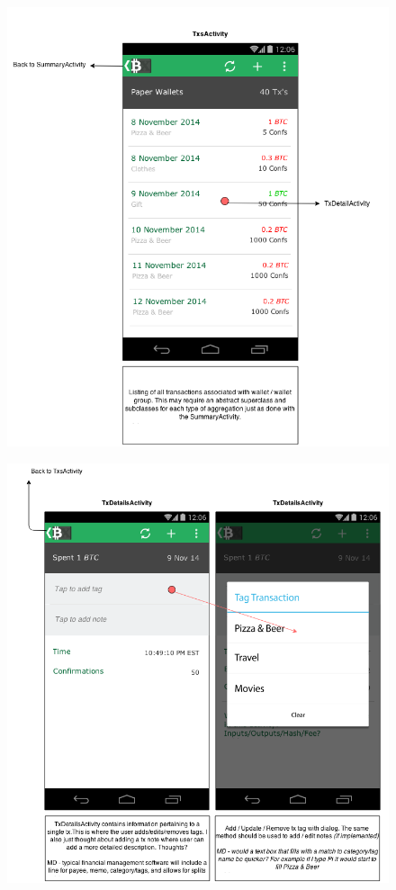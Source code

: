   \begin{figure}[H]
    \includegraphics[width=1.0\textwidth]{../diagrams/storyboard_txs.png}
  \end{figure}
  \begin{figure}[H]
    \includegraphics[width=1.0\textwidth]{../diagrams/storyboard_txDetails.png}
  \end{figure}
